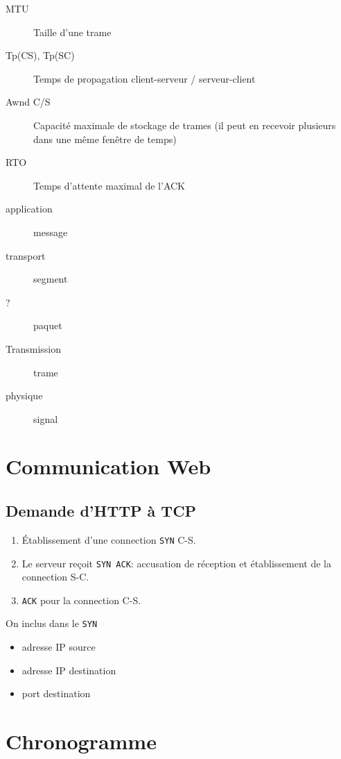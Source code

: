 \documentclass{article}
\begin{document}
    \begin{description}
        \item[MTU] Taille d'une trame
        \item[Tp(CS), Tp(SC)] Temps de propagation client-serveur / serveur-client
        \item[Awnd C/S] Capacité maximale de stockage de trames (il peut en recevoir plusieurs dans une même fenêtre de temps)
        \item[RTO] Temps d'attente maximal de l'ACK
    \end{description}

    \begin{description}
        \item[application] message
        \item[transport] segment
        \item[?] paquet
        \item[Transmission] trame
        \item[physique] signal
    \end{description}

    \section{Communication Web}
    \subsection{Demande d'HTTP à TCP}
    \begin{enumerate}
        \item Établissement d'une connection \verb|SYN| C-S.
        \item  Le serveur reçoit \verb|SYN ACK|: accusation de réception et établissement de la connection S-C.
        \item \verb|ACK| pour la connection C-S.
    \end{enumerate}

    On inclus dans le \verb|SYN|
    \begin{itemize}
        \item adresse IP source
        \item adresse IP destination
        \item port destination
    \end{itemize}

    \section{Chronogramme}
\end{document}
